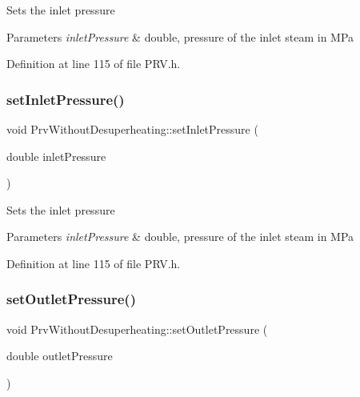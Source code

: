 Sets the inlet pressure


\begin{DoxyParams}{Parameters}
{\em inlet\+Pressure} & double, pressure of the inlet steam in M\+Pa \\
\hline
\end{DoxyParams}


Definition at line 115 of file P\+R\+V.\+h.

\mbox{\label{class_prv_without_desuperheating_a26039a0a228ca66f96e8402bf741b9d9}} 
\subsubsection{\texorpdfstring{set\+Inlet\+Pressure()}{setInletPressure()}\hspace{0.1cm}{\footnotesize\ttfamily [3/3]}}
{\footnotesize\ttfamily void Prv\+Without\+Desuperheating\+::set\+Inlet\+Pressure (\begin{DoxyParamCaption}\item[{double}]{inlet\+Pressure }\end{DoxyParamCaption})\hspace{0.3cm}{\ttfamily [inline]}}

Sets the inlet pressure


\begin{DoxyParams}{Parameters}
{\em inlet\+Pressure} & double, pressure of the inlet steam in M\+Pa \\
\hline
\end{DoxyParams}


Definition at line 115 of file P\+R\+V.\+h.

\mbox{\label{class_prv_without_desuperheating_a0f2a4597b58390e5c4a7c75b38bbebbc}} 
\subsubsection{\texorpdfstring{set\+Outlet\+Pressure()}{setOutletPressure()}\hspace{0.1cm}{\footnotesize\ttfamily [1/3]}}
{\footnotesize\ttfamily void Prv\+Without\+Desuperheating\+::set\+Outlet\+Pressure (\begin{DoxyParamCaption}\item[{double}]{outlet\+Pressure }\end{DoxyParamCaption})\hspace{0.3cm}{\ttfamily [inline]}}

